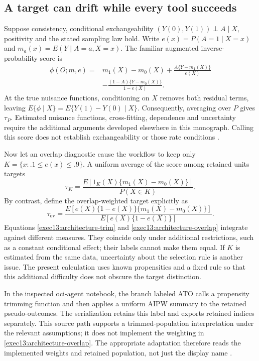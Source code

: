 \subsection{A target can drift while every tool succeeds}

Suppose consistency, conditional exchangeability
$(Y(0),Y(1))\perp A\mid X$, positivity and the stated sampling law hold.
Write $e(x)=P(A=1\mid X=x)$ and $m_a(x)=E(Y\mid A=a,X=x)$.
The familiar augmented inverse-probability score is
\begin{align}
 \phi(O;m,e)={}&m_1(X)-m_0(X)
   +\frac{A\{Y-m_1(X)\}}{e(X)}\nonumber\\
 &-\frac{(1-A)\{Y-m_0(X)\}}{1-e(X)}.
 \label{exec13:architecture-score}
\end{align}
At the true nuisance functions, conditioning on $X$ removes both residual
terms, leaving $E\{\phi\mid X\}=E\{Y(1)-Y(0)\mid X\}$.
Consequently, averaging over $P$ gives $\tau_P$. Estimated nuisance functions,
cross-fitting, dependence and uncertainty require the additional arguments
developed elsewhere in this monograph. Calling this score does not establish
exchangeability or those rate conditions \citep{hernan2020}.

Now let an overlap diagnostic cause the workflow to keep only
$K=\{x:.1\leq e(x)\leq .9\}$. A uniform average of the score among retained
units targets
\begin{equation}
 \tau_K=\frac{E[1_K(X)\{m_1(X)-m_0(X)\}]}{P(X\in K)}.
 \label{exec13:architecture-trim}
\end{equation}
By contrast, define the overlap-weighted target explicitly as
\begin{equation}
 \tau_{\mathrm{ov}}=
 \frac{E[e(X)\{1-e(X)\}\{m_1(X)-m_0(X)\}]}
      {E[e(X)\{1-e(X)\}]}.
 \label{exec13:architecture-overlap}
\end{equation}
Equations \eqref{exec13:architecture-trim} and
\eqref{exec13:architecture-overlap} integrate against different measures.
They coincide only under additional restrictions, such as a constant
conditional effect; their labels cannot make them equal. If $K$ is estimated
from the same data, uncertainty about the selection rule is another issue.
The present calculation uses known propensities and a fixed rule so that this
additional difficulty does not obscure the target distinction.

In the inspected oci-agent notebook, the branch labeled ATO calls a propensity
trimming function and then applies a uniform AIPW summary to the retained
pseudo-outcomes. The serialization retains this label and exports retained
indices separately. This source path supports a trimmed-population
interpretation under the relevant assumptions; it does not implement the
weighting in \eqref{exec13:architecture-overlap}. The appropriate adaptation
therefore reads the implemented weights and retained population, not just the
display name \citep{v12_la_package_oci_agent}.

